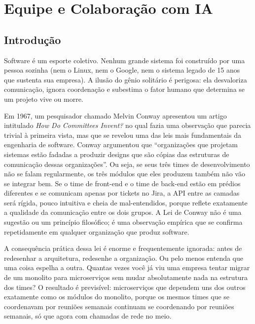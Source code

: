 \chapter{Equipe e Colaboração com IA}

\section{Introdução}

Software é um esporte coletivo. Nenhum grande sistema foi construído por uma
pessoa sozinha (nem o Linux, nem o Google, nem o sistema legado de 15 anos
que sustenta sua empresa). A ilusão do gênio solitário é perigosa: ela desvaloriza
comunicação, ignora coordenação e subestima o fator humano que determina se um
projeto vive ou morre.

Em 1967, um pesquisador chamado Melvin Conway apresentou um artigo intitulado
\textit{How Do Committees Invent?} no qual fazia uma observação que parecia
trivial à primeira vista, mas que se revelou uma das leis mais fundamentais da
engenharia de software. Conway argumentou que ``organizações que projetam
sistemas estão fadadas a produzir designs que são cópias das estruturas de
comunicação dessas organizações''. Ou seja, se seus três times de
desenvolvimento não se falam regularmente, os três módulos que eles produzem
também não vão se integrar bem. Se o time de front-end e o time de back-end
estão em prédios diferentes e se comunicam apenas por tickets no Jira, a API
entre as camadas será rígida, pouco intuitiva e cheia de mal-entendidos, porque
reflete exatamente a qualidade da comunicação entre os dois grupos. A Lei de
Conway não é uma sugestão ou um princípio filosófico; é uma observação empírica
que se confirma repetidamente em qualquer organização que produz software.

A consequência prática dessa lei é enorme e frequentemente ignorada: antes
de redesenhar a arquitetura, redesenhe a organização. Ou pelo menos entenda
que uma coisa espelha a outra. Quantas vezes você já viu uma empresa tentar
migrar de um monolito para microserviços sem mudar absolutamente nada na
estrutura dos times? O resultado é previsível: microserviços que dependem uns
dos outros exatamente como os módulos do monolito, porque os mesmos times que
se coordenavam por reuniões semanais continuam se coordenando por reuniões
semanais, só que agora com chamadas de rede no meio.

